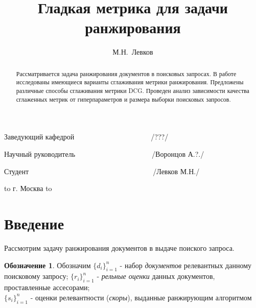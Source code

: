 \documentclass[12pt,a4paper]{amsart}
\theoremstyle{definition}
\theoremstyle{definition}
\newtheorem{designation}{Обозначение}[section]
\newenvironment{nouppercase}{%
  \let\uppercase\relax%
  \renewcommand{\uppercasenonmath}[1]{}}{}
\begin{document}
\begin{titlepage}
Заведующий кафедрой \verb"           " \underline{\quad \quad \quad \quad \quad \quad \quad}
\verb"        "
/???/

Научный руководитель \verb"           " \underline{\quad \quad \quad \quad \quad \quad \quad}
\verb"        "
/Воронцов А.?./

Студент \verb"                        " \underline{\quad \quad \quad \quad \quad \quad \quad}
\verb"        "
/Левков М.Н./

\vspace{1.0cm}

\hbox to \textwidth
{
\hss г. Москва \hss
}
\hbox to \textwidth
{
 \hss
}

\end{titlepage}


\title{Гладкая метрика для задачи ранжирования}

\author{М.Н.~Левков}


\begin{abstract}
Рассматривается задача ранжирования документов в поисковых запросах. В работе исследованы имеющиеся варианты сглаживания метрики ранжирования. Предложены различные способы сглаживания метрики DCG. Проведен анализ зависимости качества сглаженных метрик от гиперпараметров и размера выборки поисковых запросов.
\end{abstract}


\begin{nouppercase}
\maketitle
\end{nouppercase}

\tableofcontents

\pagebreak


\section{Введение}

Рассмотрим задачу ранжирования документов в выдаче поиского запроса.
\begin{designation}
Обозначим $\{d_i\}_{i=1}^n$ - набор \textit{документов} релевантных данному поисковому запросу; 
$\{r_i\}_{i=1}^n$ - \textit{рельные оценки} данных документов, проставленные ассесорами; \\
$\{s_i\}_{i=1}^n$ - оценки релевантности (\textit{скоры}), выданные ранжирующим алгоритмом
\end{designation}
\end{document}
